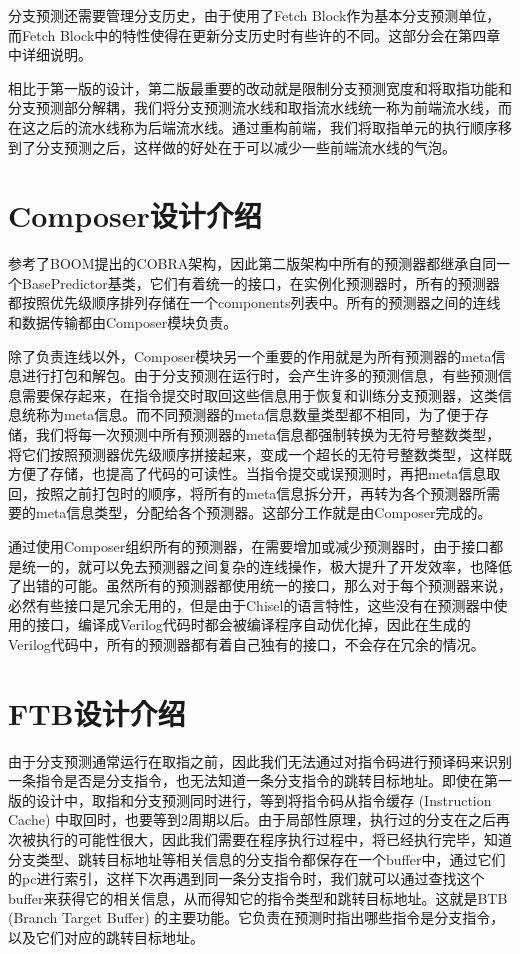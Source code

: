 分支预测还需要管理分支历史，由于使用了Fetch Block作为基本分支预测单位，而Fetch Block中的特性使得在更新分支历史时有些许的不同。这部分会在第四章中详细说明。

相比于第一版的设计，第二版最重要的改动就是限制分支预测宽度和将取指功能和分支预测部分解耦，我们将分支预测流水线和取指流水线统一称为前端流水线，而在这之后的流水线称为后端流水线。通过重构前端，我们将取指单元的执行顺序移到了分支预测之后，这样做的好处在于可以减少一些前端流水线的气泡。

\section{Composer设计介绍}

参考了BOOM提出的COBRA架构，因此第二版架构中所有的预测器都继承自同一个BasePredictor基类，它们有着统一的接口，在实例化预测器时，所有的预测器都按照优先级顺序排列存储在一个components列表中。所有的预测器之间的连线和数据传输都由Composer模块负责。

除了负责连线以外，Composer模块另一个重要的作用就是为所有预测器的meta信息进行打包和解包。由于分支预测在运行时，会产生许多的预测信息，有些预测信息需要保存起来，在指令提交时取回这些信息用于恢复和训练分支预测器，这类信息统称为meta信息。而不同预测器的meta信息数量类型都不相同，为了便于存储，我们将每一次预测中所有预测器的meta信息都强制转换为无符号整数类型，将它们按照预测器优先级顺序拼接起来，变成一个超长的无符号整数类型，这样既方便了存储，也提高了代码的可读性。当指令提交或误预测时，再把meta信息取回，按照之前打包时的顺序，将所有的meta信息拆分开，再转为各个预测器所需要的meta信息类型，分配给各个预测器。这部分工作就是由Composer完成的。

通过使用Composer组织所有的预测器，在需要增加或减少预测器时，由于接口都是统一的，就可以免去预测器之间复杂的连线操作，极大提升了开发效率，也降低了出错的可能。虽然所有的预测器都使用统一的接口，那么对于每个预测器来说，必然有些接口是冗余无用的，但是由于Chisel的语言特性，这些没有在预测器中使用的接口，编译成Verilog代码时都会被编译程序自动优化掉，因此在生成的Verilog代码中，所有的预测器都有着自己独有的接口，不会存在冗余的情况。

\section{FTB设计介绍}

由于分支预测通常运行在取指之前，因此我们无法通过对指令码进行预译码来识别一条指令是否是分支指令，也无法知道一条分支指令的跳转目标地址。即使在第一版的设计中，取指和分支预测同时进行，等到将指令码从指令缓存 (Instruction Cache) 中取回时，也要等到2周期以后。由于局部性原理，执行过的分支在之后再次被执行的可能性很大，因此我们需要在程序执行过程中，将已经执行完毕，知道分支类型、跳转目标地址等相关信息的分支指令都保存在一个buffer中，通过它们的pc进行索引，这样下次再遇到同一条分支指令时，我们就可以通过查找这个buffer来获得它的相关信息，从而得知它的指令类型和跳转目标地址。这就是BTB (Branch Target Buffer) 的主要功能。它负责在预测时指出哪些指令是分支指令，以及它们对应的跳转目标地址。

